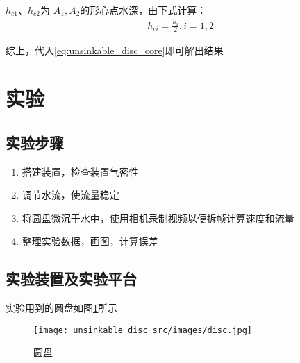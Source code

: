 \documentclass[UTF8]{gapd}
\begin{document}
$h_{c1}$、$h_{c2}$为 $A_1,A_2$的形心点水深，由下式计算：
\begin{align}
    h_{ci}=\frac{h_i}{2},i=1,2
\end{align}

综上，代入\eqref{eq:unsinkable_disc_core}即可解出结果
\section{实验}
\label{sec:unsinkable_disc_experiment}
\subsection{实验步骤}
\begin{enumerate}
    \item 搭建装置，检查装置气密性
    \item 调节水流，使流量稳定
    \item 将圆盘微沉于水中，使用相机录制视频以便拆帧计算速度和流量
    \item 整理实验数据，画图，计算误差
\end{enumerate}
\subsection{实验装置及实验平台}
实验用到的圆盘如图\ref{fig:unsinkable_disc_discs}所示
\begin{figure}[H]%
  \centering
  \texttt{[image: unsinkable\_disc\_src/images/disc.jpg]}
  \caption{圆盘}
  \label{fig:unsinkable_disc_discs}%
\end{figure}
\end{document}
